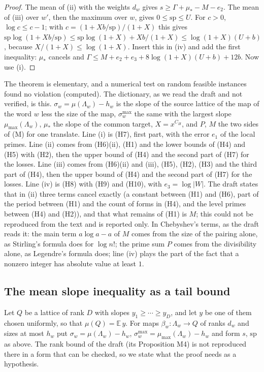 \begin{proof}
The mean of (ii) with the weights $d_w$ gives $s\ge\Gamma+\mu_*-M-e_2$. The mean of (iii) over $w'$, then the maximum over $w$, gives $0\le\mathrm{sp}\le U$. For $c>0$, $\log c\le c-1$; with $c=(1+Xb/\mathrm{sp})/(1+X)$ this gives $\mathrm{sp}\log(1+Xb/\mathrm{sp})\le\mathrm{sp}\log(1+X)+Xb/(1+X)\le\log(1+X)(U+b)$, because $X/(1+X)\le\log(1+X)$. Insert this in (iv) and add the first inequality: $\mu_*$ cancels and $\Gamma\le M+e_2+e_3+8\log(1+X)(U+b)+12b$. Now use (i).
\end{proof}

The theorem is elementary, and a numerical test on random feasible instances found no violation (computed). The dictionary, as we read the draft and not verified, is this. $\sigma_w=\mu(\Lambda_w)-h_w$ is the slope of the source lattice of the map of the word $w$ less the size of the map, $\sigma_w^{\max}$ the same with the largest slope $\mu_{\max}(\Lambda_w)$, $\mu_*$ the slope of the common target, $X=x^{C_H}$, and $P$, $M$ the two sides of (M) for one translate. Line (i) is (H7), first part, with the error $e_1$ of the local primes. Line (ii) comes from (H6)(ii), (H1) and the lower bounds of (H4) and (H5) with (H2), then the upper bound of (H4) and the second part of (H7) for the losses. Line (iii) comes from (H6)(ii) and (iii), (H5), (H2), (H3) and the third part of (H4), then the upper bound of (H4) and the second part of (H7) for the losses. Line (iv) is (H8) with (H9) and (H10), with $e_3=\log|W|$. The draft states that in (ii) three terms cancel exactly (a constant between (H1) and (H6), part of the period between (H1) and the count of forms in (H4), and the level primes between (H4) and (H2)), and that what remains of (H1) is $M$; this could not be reproduced from the text and is reported only. In Chebyshev's terms, as the draft reads it: the main term $a\log a-a$ of $M$ comes from the size of the pairing alone, as Stirling's formula does for $\log n!$; the prime sum $P$ comes from the divisibility alone, as Legendre's formula does; line (iv) plays the part of the fact that a nonzero integer has absolute value at least $1$.

\subsection*{The mean slope inequality as a tail bound}

Let $Q$ be a lattice of rank $D$ with slopes $y_1\ge\cdots\ge y_D$, and let $y$ be one of them chosen uniformly, so that $\mu(Q)=\mathbb E\,y$. For maps $\beta_w:\Lambda_w\to Q$ of ranks $d_w$ and sizes at most $h_w$ put $\sigma_w=\mu(\Lambda_w)-h_w$, $\sigma_w^{\max}=\mu_{\max}(\Lambda_w)-h_w$ and form $s$, $\mathrm{sp}$ as above. The rank bound of the draft (its Proposition M4) is not reproduced there in a form that can be checked, so we state what the proof needs as a hypothesis.

